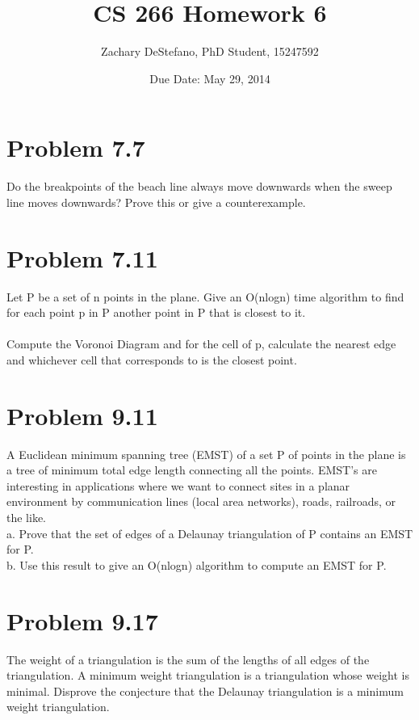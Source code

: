 \documentclass[11pt,psfig]{article}
\begin{document}
\setlength{\parskip}{1.2ex plus0.3ex minus 0.3ex}


\thispagestyle{empty} \pagestyle{myheadings} 



\title{CS 266 Homework 6}
\author{Zachary DeStefano, PhD Student, 15247592}
\date{Due Date: May 29, 2014}

\maketitle

\vfill\eject

\section*{Problem 7.7}
Do the breakpoints of the beach line always move downwards when the
sweep line moves downwards? Prove this or give a counterexample.

\section*{Problem 7.11}

Let P be a set of n points in the plane. Give an O(nlogn) time algorithm
to find for each point p in P another point in P that is closest to it.\\
\\
Compute the Voronoi Diagram and for the cell of p, calculate the nearest edge and whichever cell that corresponds to is the closest point. 

\section*{Problem 9.11}

A Euclidean minimum spanning tree (EMST) of a set P of points in the
plane is a tree of minimum total edge length connecting all the points.
EMST’s are interesting in applications where we want to connect sites
in a planar environment by communication lines (local area networks),
roads, railroads, or the like.\\
a. Prove that the set of edges of a Delaunay triangulation of P contains
an EMST for P.\\
b. Use this result to give an O(nlogn) algorithm to compute an EMST
for P.\\

\section*{Problem 9.17}

The weight of a triangulation is the sum of the lengths of all edges of
the triangulation. A minimum weight triangulation is a triangulation
whose weight is minimal. Disprove the conjecture that the Delaunay
triangulation is a minimum weight triangulation.

\end{document}
